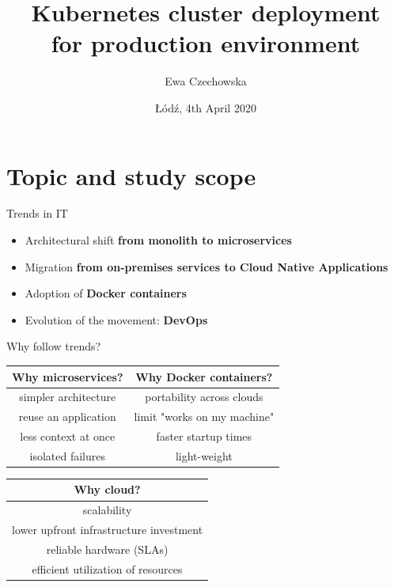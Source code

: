 \documentclass{beamer}
\title{Kubernetes cluster deployment \\ for production environment}
\author{Ewa Czechowska}
\institute{Technical University of Lodz}
\date{Łódź, 4th April 2020}
\begin{document}
\maketitle

\section{Topic and study scope}
\begin{frame}{Trends in IT}%
\begin{itemize}
\item Architectural shift {\bfseries from monolith to microservices}
\item Migration {\bfseries from on-premises services to Cloud Native Applications}
\item Adoption of {\bfseries Docker containers}
\item Evolution of the movement: {\bfseries DevOps}
\end{itemize}
\end{frame}

\begin{frame}{Why follow trends?}%
\begin{center}
	\begin{tabular}{ | c | c |}
		\hline
		{\bfseries Why microservices?} & {\bfseries Why Docker containers?} \\ \hline
		simpler architecture & portability across clouds \\ \hline
		reuse an application & limit "works on my machine" \\ \hline
		less context at once & faster startup times \\ \hline
		isolated failures &  light-weight \\ \hline
		\hline
	\end{tabular}
	\begin{tabular}{ | c |}
		\hline
		 {\bfseries Why cloud?} \\ \hline
		 scalability \\ \hline
		 lower upfront infrastructure investment \\ \hline
		 reliable hardware (SLAs) \\ \hline
		 efficient utilization of resources \\ \hline
		\hline
	\end{tabular}
\end{center}
\end{frame}

\end{document}
